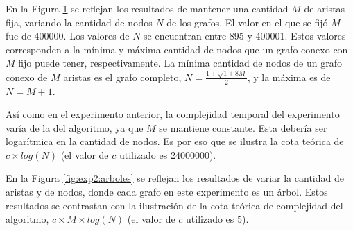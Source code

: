     \renewcommand\constante{24000000}

    En la Figura \ref{fig:exp2:m_fijo} se reflejan los resultados de mantener una cantidad $M$ de aristas fija, variando la cantidad de nodos $N$ de los grafos. El valor en el que se fijó $M$ fue de 400000. Los valores de $N$ se encuentran entre 895 y 400001. Estos valores corresponden a la mínima y máxima cantidad de nodos que un grafo conexo con $M$ fijo puede tener, respectivamente. La mínima cantidad de nodos de un grafo conexo de $M$ aristas es el grafo completo, $N = \frac{1 + \sqrt{1 + 8M}}{2}$, y la máxima es de $N = M + 1$.

    Así como en el experimento anterior, la complejidad temporal del experimento varía de la del algoritmo, ya que $M$ se mantiene constante. Esta debería ser logarítmica en la cantidad de nodos. Es por eso que se ilustra la cota teórica de $c \times log(N)$ (el valor de $c$ utilizado es \constante).

    \begin{figure}[H]
        \centering
        \caption{}
        \label{fig:exp2:m_fijo}
    \end{figure}

    \renewcommand\constante{5}

    En la Figura \ref{fig:exp2:arboles} se reflejan los resultados de variar la cantidad de aristas y de nodos, donde cada grafo en este experimento es un árbol. Estos resultados se contrastan con la ilustración de la cota teórica de complejidad del algoritmo, $c \times M \times log(N)$ (el valor de $c$ utilizado es \constante).

